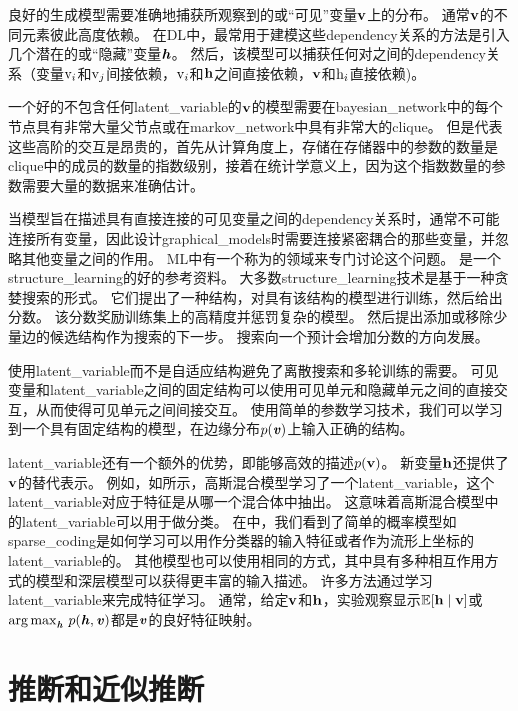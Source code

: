 良好的生成模型需要准确地捕获所观察到的或``可见''变量$\mathbf{v}$上的分布。
通常$\mathbf{v}$的不同元素彼此高度依赖。
在\gls{DL}中，最常用于建模这些\gls{dependency}关系的方法是引入几个潜在的或``隐藏''变量$\boldsymbol{\mathit{h}}$。
然后，该模型可以捕获任何对之间的\gls{dependency}关系（变量$\mathrm{v}_i$和$\mathrm{v}_j$间接依赖，$\mathrm{v}_i$和$\mathbf{h}$之间直接依赖，$\mathbf{v}$和$\mathrm{h}_i$直接依赖)。

一个好的不包含任何\gls{latent_variable}的$\mathbf{v}$的模型需要在\gls{bayesian_network}中的每个节点具有非常大量父节点或在\gls{markov_network}中具有非常大的\gls{clique}。
但是代表这些高阶的交互是昂贵的，首先从计算角度上，存储在存储器中的参数的数量是\gls{clique}中的成员的数量的指数级别，接着在统计学意义上，因为这个指数数量的参数需要大量的数据来准确估计。


当模型旨在描述具有直接连接的可见变量之间的\gls{dependency}关系时，通常不可能连接所有变量，因此设计\gls{graphical_models}时需要连接紧密耦合的那些变量，并忽略其他变量之间的作用。
\gls{ML}中有一个称为的领域来专门讨论这个问题。
\citet{koller-book2009}是一个\gls{structure_learning}的好的参考资料。
大多数\gls{structure_learning}技术是基于一种贪婪搜索的形式。
它们提出了一种结构，对具有该结构的模型进行训练，然后给出分数。 
该分数奖励训练集上的高精度并惩罚复杂的模型。
然后提出添加或移除少量边的候选结构作为搜索的下一步。
搜索向一个预计会增加分数的方向发展。 


使用\gls{latent_variable}而不是自适应结构避免了离散搜索和多轮训练的需要。 
可见变量和\gls{latent_variable}之间的固定结构可以使用可见单元和隐藏单元之间的直接交互，从而使得可见单元之间间接交互。
使用简单的参数学习技术，我们可以学习到一个具有固定结构的模型，在边缘分布$p(\boldsymbol{\mathit{v}})$上输入正确的结构。


\gls{latent_variable}还有一个额外的优势，即能够高效的描述$p(\mathbf{v})$。
新变量$\mathbf{h}$还提供了$\mathbf{v}$的替代表示。
例如，如所示，高斯混合模型学习了一个\gls{latent_variable}，这个\gls{latent_variable}对应于特征是从哪一个混合体中抽出。
这意味着高斯混合模型中的\gls{latent_variable}可以用于做分类。
在中，我们看到了简单的概率模型如\gls{sparse_coding}是如何学习可以用作分类器的输入特征或者作为流形上坐标的\gls{latent_variable}的。
其他模型也可以使用相同的方式，其中具有多种相互作用方式的模型和深层模型可以获得更丰富的输入描述。
许多方法通过学习\gls{latent_variable}来完成特征学习。
通常，给定$\mathbf{v}$和$\mathbf{h}$，实验观察显示$\mathbb{E}[\mathbf{h}\mid\mathbf{v}]$或${\arg\max}_{\boldsymbol{\mathit{h}}}\ p(\boldsymbol{\mathit{h}},\boldsymbol{\mathit{v}})$都是$\boldsymbol{\mathit{v}}$的良好特征映射。

\section{推断和近似推断}
\label{sec:inference_and_approximate_inference}


